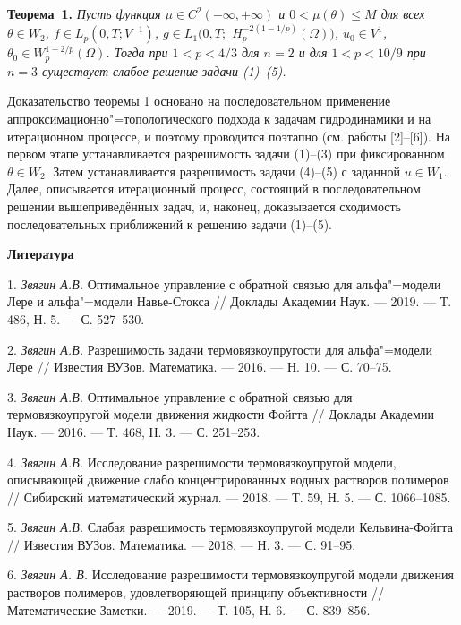 \textbf{Теорема~1.} {\it Пусть функция $\mu \in C^2(-\infty,+\infty)$ и $0<\mu(\theta)\leq M$ для всех $\theta \in W_2$, $f \in L_p(0,T;V^{-1})$, $g \in L_1(0,T;$ $H^{-2(1-1/p)}_p(\Omega))$, $u_0 \in V^1$, $\theta_0 \in W^{1-2/p}_p(\Omega)$. Тогда при $1<p<4/3$ для $n=2$ и для $1<p<10/9$ при $n=3$ существует слабое решение задачи (1)--(5).}

Доказательство теоремы 1 основано на последовательном применение аппроксимационно"=топологического подхода к задачам гидродинамики и на итерационном процессе, и поэтому проводится поэтапно (см. работы [2]--[6]). На первом этапе устанавливается разрешимость задачи (1)--(3) при фиксированном $\theta \in W_2$. Затем устанавливается разрешимость задачи (4)--(5) с заданной $u \in W_1$. Далее, описывается итерационный процесс, состоящий в последовательном решении вышеприведённых задач, и, наконец, доказывается сходимость последовательных приближений к решению задачи (1)--(5).




\smallskip \centerline {\bf Литература} \nopagebreak

1. {\it Звягин А.В.} Оптимальное управление с обратной связью для альфа"=модели Лере и альфа"=модели Навье-Стокса // Доклады Академии Наук. --- 2019. --- Т. 486, Н. 5. --- С. 527--530.

2. {\it Звягин А.В.} Разрешимость задачи термовязкоупругости для альфа"=модели Лере // Известия ВУЗов. Математика. --- 2016. --- Н. 10. --- С. 70--75.

3. {\it Звягин А.В.} Оптимальное управление с обратной связью для термовязкоупругой модели движения жидкости Фойгта // Доклады Академии Наук. --- 2016. --- Т. 468, Н. 3. --- С. 251--253.

4. {\it Звягин А.В.} Исследование разрешимости термовязкоупругой модели, описывающей движение слабо концентрированных водных растворов полимеров // Сибирский математический журнал. --- 2018. --- Т. 59, Н. 5. --- С. 1066--1085.

5. {\it Звягин А.В.} Слабая разрешимость термовязкоупругой модели Кельвина-Фойгта // Известия ВУЗов. Математика. --- 2018. --- Н. 3. --- С. 91--95.

6. {\it Звягин А. В.} Исследование разрешимости термовязкоупругой модели движения растворов полимеров, удовлетворяющей принципу объективности // Математические Заметки. --- 2019. --- Т. 105, Н. 6. --- С. 839--856.

